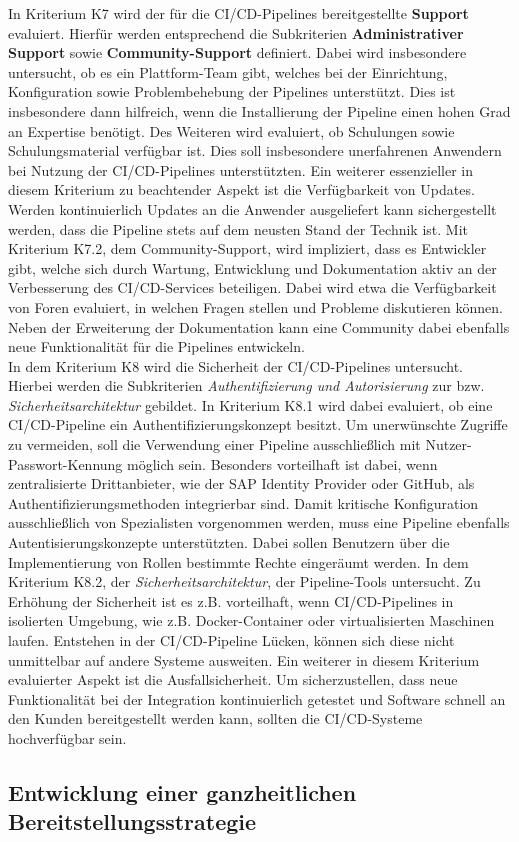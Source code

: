 In Kriterium K7 wird der für die CI/CD-Pipelines bereitgestellte \textbf{Support} evaluiert. Hierfür werden entsprechend die Subkriterien \textbf{Administrativer Support} sowie \textbf{Community-Support} definiert. Dabei wird insbesondere untersucht, ob es ein Plattform-Team gibt, welches bei der Einrichtung, Konfiguration sowie Problembehebung der Pipelines unterstützt. Dies ist insbesondere dann hilfreich, wenn die Installierung der Pipeline einen hohen Grad an Expertise benötigt. Des Weiteren wird evaluiert, ob Schulungen sowie Schulungsmaterial verfügbar ist. Dies soll insbesondere unerfahrenen Anwendern bei Nutzung der CI/CD-Pipelines unterstützten. Ein weiterer essenzieller in diesem Kriterium zu beachtender Aspekt ist die Verfügbarkeit von Updates. Werden kontinuierlich Updates an die Anwender ausgeliefert kann sichergestellt werden, dass die Pipeline stets auf dem neusten Stand der Technik ist. Mit Kriterium K7.2, dem Community-Support, wird impliziert, dass es Entwickler gibt, welche sich durch Wartung, Entwicklung und Dokumentation aktiv an der Verbesserung des CI/CD-Services beteiligen. Dabei wird etwa die Verfügbarkeit von Foren evaluiert, in welchen Fragen stellen und Probleme diskutieren können. Neben der Erweiterung der Dokumentation kann eine Community dabei ebenfalls neue Funktionalität für die Pipelines entwickeln.\\
In dem Kriterium K8 wird die Sicherheit der CI/CD-Pipelines untersucht. Hierbei werden die Subkriterien \textit{Authentifizierung und Autorisierung} zur bzw. \textit{Sicherheitsarchitektur} gebildet. In Kriterium K8.1 wird dabei evaluiert, ob eine CI/CD-Pipeline ein Authentifizierungskonzept besitzt. Um unerwünschte Zugriffe zu vermeiden, soll die Verwendung einer Pipeline ausschließlich mit Nutzer-Passwort-Kennung möglich sein. Besonders vorteilhaft ist dabei, wenn zentralisierte Drittanbieter, wie der SAP Identity Provider oder GitHub, als Authentifizierungsmethoden integrierbar sind. Damit kritische Konfiguration ausschließlich von Spezialisten vorgenommen werden, muss eine Pipeline ebenfalls Autentisierungskonzepte unterstützten. Dabei sollen Benutzern über die Implementierung von Rollen bestimmte Rechte eingeräumt werden. In dem Kriterium K8.2, der \textit{Sicherheitsarchitektur}, der Pipeline-Tools untersucht. Zu Erhöhung der Sicherheit ist es z.B. vorteilhaft, wenn CI/CD-Pipelines in isolierten Umgebung, wie z.B. Docker-Container oder virtualisierten Maschinen laufen. Entstehen in der CI/CD-Pipeline Lücken, können sich diese nicht unmittelbar auf andere Systeme ausweiten. Ein weiterer in diesem Kriterium evaluierter Aspekt ist die Ausfallsicherheit. Um sicherzustellen, dass neue Funktionalität bei der Integration kontinuierlich getestet und Software schnell an den Kunden bereitgestellt werden kann, sollten die CI/CD-Systeme hochverfügbar sein.  
\subsection{Entwicklung einer ganzheitlichen Bereitstellungsstrategie}
